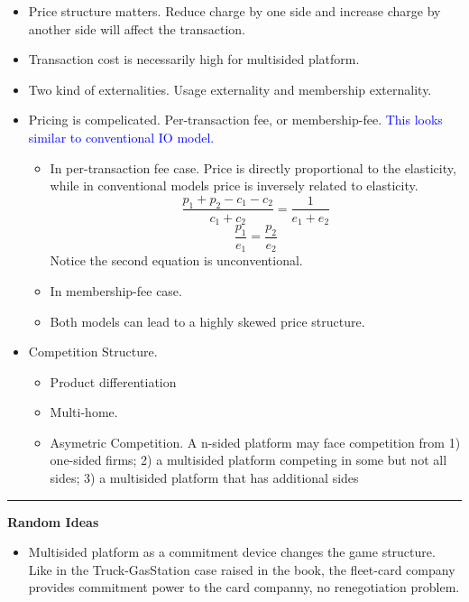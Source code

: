 \documentclass{book}
\theoremstyle{plain}
\theoremstyle{definition}
\newcommand{\myline}{\vspace{3mm} \hrule \vspace{4mm}}
\begin{document}
\textbf{ }
\begin{itemize}
	\item Price structure matters. Reduce charge by one side and increase charge by another side will affect the transaction.
	\item Transaction cost is necessarily high for multisided platform.
	\item Two kind of externalities. Usage externality and membership externality.
	\item Pricing is compelicated. Per-transaction fee, or membership-fee. \textcolor{blue}{This looks similar to conventional IO model.}
	\begin{itemize}
		\item In per-transaction fee case. Price is directly proportional to the elasticity, while in conventional models price is inversely related to elasticity.
		\[\frac{p_1+p_2-c_1-c_2}{c_1+c_2}=\frac{1}{e_1+e_2}\]
		\[\frac{p_1}{e_1}=\frac{p_2}{e_2}\]
		Notice the second equation is unconventional.
		\item In membership-fee case.
		\item Both models can lead to a highly skewed price structure.
	\end{itemize}
	\item Competition Structure.
	\begin{itemize}
		\item Product differentiation
		\item Multi-home.
		\item Asymetric Competition. A n-sided platform may face competition from 1) one-sided firms; 2) a multisided platform competing in some but not all sides; 3) a multisided platform that has additional sides
	\end{itemize}
\end{itemize}


\myline

\textbf{Random Ideas}
\begin{itemize}
	\item Multisided platform as a commitment device changes the game structure. Like in the Truck-GasStation case raised in the book, the fleet-card company provides commitment power to the card companny, no renegotiation problem.
\end{itemize}

\end{document}
